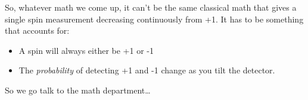 \documentclass[
]{book}
\providecommand{\tightlist}{%
  \setlength{\itemsep}{0pt}\setlength{\parskip}{0pt}}
\begin{document}
So, whatever math we come up, it can't be the same classical math that gives a single spin measurement decreasing continuously from +1. It has to be something that accounts for:

\begin{itemize}
\tightlist
\item
  A spin will always either be +1 or -1
\item
  The \emph{probability} of detecting +1 and -1 change as you tilt the detector.
\end{itemize}

So we go talk to the math department\ldots{}

  
\end{document}
